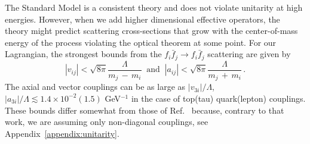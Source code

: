\documentclass[prd,amsfonts,onecolumn,superscriptaddress,aps,nofootinbib,11pt]{revtex4-1}
\begin{document}
The Standard Model is a consistent theory and does not violate unitarity at high energies. However, when we add higher dimensional effective operators, the theory might predict scattering cross-sections that grow with the center-of-mass energy of the process violating the optical theorem at some point. For our Lagrangian, the strongest bounds from the $f_i \bar{f}_j \rightarrow f_i \bar{f}_j$ scattering are given by
%
\begin{equation}\label{eq:unitarity-bounds}
  \left|v_{ij} \right| < \sqrt{8\pi}\frac{\Lambda}{m_j\,-\,m_i} \;\;\mbox{and}\;\; \left|a_{ij} \right| < \sqrt{8\pi}\frac{\Lambda}{m_j\,+\,m_i}\, .
\end{equation}
The axial and vector couplings can be as large as $\left|v_{3i}\right|/\Lambda$, $\left|a_{3i}\right|/\Lambda \lesssim 1.4\times 10^{-2}(1.5)$ GeV$^{-1}$ in the case of top(tau) quark(lepton) couplings. These bounds differ somewhat from those of Ref.~\cite{Cornella:2019uxs} because, contrary to that work, we are assuming only non-diagonal couplings, see Appendix~\ref{appendix:unitarity}.






\end{document}
